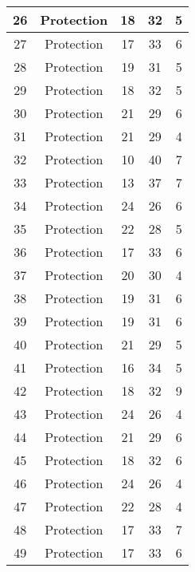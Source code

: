 \documentclass[results.tex]{subfiles}
\begin{document}
\begin{center}
\begin{tabular}{| c || c | c | c | c |}
    \hline
    26 & Protection & 18 & 32 & 5 \\ 
    \hline
    27 & Protection & 17 & 33 & 6 \\ 
    \hline
    28 & Protection & 19 & 31 & 5 \\ 
    \hline
    29 & Protection & 18 & 32 & 5 \\ 
    \hline
    30 & Protection & 21 & 29 & 6 \\ 
    \hline
    31 & Protection & 21 & 29 & 4 \\ 
    \hline
    32 & Protection & 10 & 40 & 7 \\ 
    \hline
    33 & Protection & 13 & 37 & 7 \\ 
    \hline
    34 & Protection & 24 & 26 & 6 \\ 
    \hline
    35 & Protection & 22 & 28 & 5 \\ 
    \hline
    36 & Protection & 17 & 33 & 6 \\ 
    \hline
    37 & Protection & 20 & 30 & 4 \\ 
    \hline
    38 & Protection & 19 & 31 & 6 \\ 
    \hline
    39 & Protection & 19 & 31 & 6 \\ 
    \hline
    40 & Protection & 21 & 29 & 5 \\ 
    \hline
    41 & Protection & 16 & 34 & 5 \\ 
    \hline
    42 & Protection & 18 & 32 & 9 \\ 
    \hline
    43 & Protection & 24 & 26 & 4 \\ 
    \hline
    44 & Protection & 21 & 29 & 6 \\ 
    \hline
    45 & Protection & 18 & 32 & 6 \\ 
    \hline
    46 & Protection & 24 & 26 & 4 \\ 
    \hline
    47 & Protection & 22 & 28 & 4 \\ 
    \hline
    48 & Protection & 17 & 33 & 7 \\ 
    \hline
    49 & Protection & 17 & 33 & 6 \\ 
    \hline   \end{tabular}
\end{center}
\end{document}
